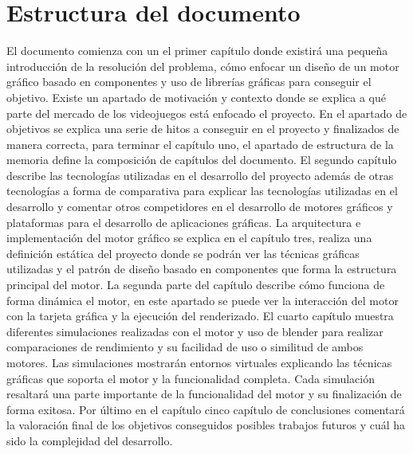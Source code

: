 \documentclass[a4paper, 17pt]{book}
\begin{document}
\section{Estructura del documento}
\label{sec:estructura}

El documento comienza con un el primer capítulo donde existirá una pequeña introducción de la resolución 
del problema, cómo enfocar un diseño de un motor gráfico basado en componentes y uso de librerías gráficas
para conseguir el objetivo. Existe un apartado de motivación y contexto donde se explica a qué parte del
mercado de los videojuegos está enfocado el proyecto. En el apartado de objetivos se explica una serie de
hitos a conseguir en el proyecto y finalizados de manera correcta, para terminar el capítulo uno, el
apartado de estructura de la memoria define la composición de capítulos del documento.
\bigbreak
El segundo capítulo describe las tecnologías utilizadas en el desarrollo del proyecto además de otras
tecnologías a forma de comparativa para explicar las tecnologías utilizadas en el desarrollo y comentar
otros competidores en el desarrollo de motores gráficos y plataformas para el desarrollo de aplicaciones gráficas. 
\bigbreak
La arquitectura e implementación del motor gráfico se explica en el capítulo tres, realiza una definición
estática del proyecto donde se podrán ver las técnicas gráficas utilizadas y el patrón de diseño basado en
componentes que forma la estructura principal del motor. La segunda parte del capítulo describe cómo
funciona de forma dinámica el motor, en este apartado se puede ver la interacción del motor con la tarjeta
gráfica y la ejecución del renderizado.
\bigbreak
El cuarto capítulo muestra diferentes simulaciones realizadas con el motor y uso de blender para realizar
comparaciones de rendimiento y su facilidad de uso o similitud de ambos motores. Las simulaciones mostrarán
entornos virtuales explicando las técnicas gráficas que soporta el motor y la funcionalidad completa.
Cada simulación resaltará una parte importante de la funcionalidad del motor y su finalización de forma exitosa.
Por último en el capítulo cinco capítulo de conclusiones comentará la valoración final de los objetivos
conseguidos posibles trabajos futuros y cuál ha sido la complejidad del desarrollo.

  
  
\end{document}
